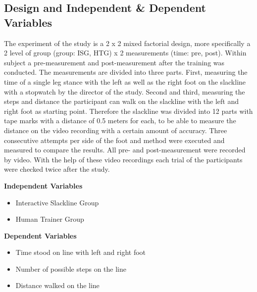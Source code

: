 \subsection{Design and Independent \& Dependent Variables}\label{6_variables}
The experiment of the study is a 2 x 2 mixed factorial design, more specifically a 2 level of group (group: ISG, HTG)  x 2 measurements (time: pre, post).
Within subject a pre-measurement and post-measurement after the training was conducted.
The measurements are divided into three parts.
First, measuring the time of a single leg stance with the left as well as the right foot on the slackline with a stopwatch by the director of the study.
Second and third, measuring the steps and distance the participant can walk on the slackline with the left and right foot as starting point.
Therefore the slackline was divided into 12 parts with tape marks with a distance of 0.5 meters for each, to be able to measure the distance on the video recording with a certain amount of accuracy.
Three consecutive attempts per side of the foot and method were executed and measured to compare the results.
All pre- and post-measurement were recorded by video.
With the help of these video recordings each trial of the participants were checked twice after the study.

\textbf{Independent Variables}
\begin{itemize}
\item Interactive Slackline Group
\item Human Trainer Group
\end{itemize}

\textbf{Dependent Variables}
\begin{itemize}
\item Time stood on line with left and right foot
\item Number of possible steps on the line 
\item Distance walked on the line
\end{itemize}




